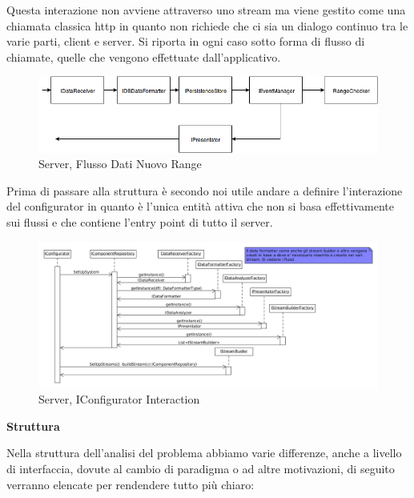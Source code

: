 Questa interazione non avviene attraverso uno stream ma viene gestito come una chiamata classica http in quanto non richiede che ci sia un dialogo continuo tra le varie parti, client e server. Si riporta in ogni caso sotto forma di flusso di chiamate, quelle che vengono effettuate dall'applicativo.

\begin{figure}[h]
\centering
\includegraphics[width=\textwidth]{Figures/LogicArchitecture/Server/FlowDiagramNewRange}
\caption{Server, Flusso Dati Nuovo Range}
\end{figure}

\newpage

Prima di passare alla struttura \`e secondo noi utile andare a definire l'interazione del configurator in quanto \`e l'unica entit\`a attiva che non si basa effettivamente sui flussi e che contiene l'entry point di tutto il server.

\begin{figure}[h]
\centering
\includegraphics[width=\textwidth]{Figures/LogicArchitecture/Server/IConfiguratorInteraction}
\caption{Server, IConfigurator Interaction}
\end{figure}

\newpage

\begin{center}
\textbf{Struttura}
\end{center}

Nella struttura dell'analisi del problema abbiamo varie differenze, anche a livello di interfaccia, dovute al cambio di paradigma o ad altre motivazioni, di seguito verranno elencate per rendendere tutto pi\`u chiaro:


